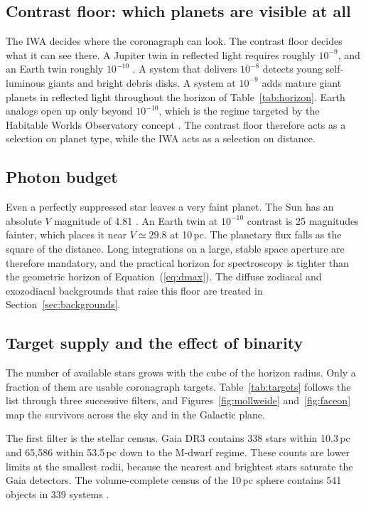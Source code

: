 \subsection{Contrast floor: which planets are visible at all}

The IWA decides where the coronagraph can look. The contrast floor
decides what it can see there. A Jupiter twin in reflected light
requires roughly $10^{-9}$, and an Earth twin roughly $10^{-10}$
\cite{traub10}. A system that delivers $10^{-8}$ detects young
self-luminous giants and bright debris disks. A system at $10^{-9}$
adds mature giant planets in reflected light throughout the horizon of
Table~\ref{tab:horizon}. Earth analogs open up only beyond $10^{-10}$,
which is the regime targeted by the Habitable Worlds Observatory
concept \cite{hwo26}. The contrast floor therefore acts as a
selection on planet type, while the IWA acts as a selection on
distance.

\subsection{Photon budget}

Even a perfectly suppressed star leaves a very faint planet. The Sun
has an absolute $V$ magnitude of 4.81 \cite{willmer18}. An Earth twin
at $10^{-10}$ contrast is 25 magnitudes fainter, which places it near
$V\simeq29.8$ at 10\,pc. The planetary flux falls as the square of the
distance. Long integrations on a large, stable space aperture are
therefore mandatory, and the practical horizon for spectroscopy is
tighter than the geometric horizon of Equation~(\ref{eq:dmax}). The
diffuse zodiacal and exozodiacal backgrounds that raise this floor are
treated in Section~\ref{sec:backgrounds}.

\subsection{Target supply and the effect of binarity}

The number of available stars grows with the cube of the horizon
radius. Only a fraction of them are usable coronagraph targets.
Table~\ref{tab:targets} follows the list through three successive
filters, and Figures~\ref{fig:mollweide} and~\ref{fig:faceon} map the
survivors across the sky and in the Galactic plane.

The first filter is the stellar census. Gaia DR3 \cite{gaiadr3}
contains 338 stars within 10.3\,pc and 65{,}586 within 53.5\,pc down to
the M-dwarf regime. These counts are lower limits at the smallest
radii, because the nearest and brightest stars saturate the Gaia
detectors. The volume-complete census of the 10\,pc sphere contains
541 objects in 339 systems \cite{reyle21}.

